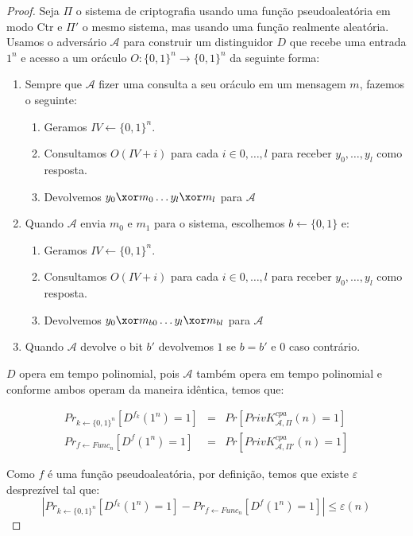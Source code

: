 \begin{proof}
  Seja $\Pi$ o sistema de criptografia usando uma função pseudoaleatória em modo Ctr e $\Pi'$ o mesmo sistema, mas usando uma função realmente aleatória.
Usamos o adversário $\mathcal{A}$ para construir um distinguidor $D$ que recebe uma entrada $1^n$ e acesso a um oráculo $O:\{0,1\}^n \to \{0,1\}^n$ da seguinte forma:
\begin{enumerate}
\item Sempre que $\mathcal{A}$ fizer uma consulta a seu oráculo em um mensagem $m$, fazemos o seguinte:
\begin{enumerate}
\item Geramos $IV \leftarrow \{0,1\}^n$.
\item Consultamos $O(IV + i)$ para cada $i \in 0, \dots, l$ para receber $y_0, \dots, y_l$ como resposta.
\item Devolvemos $y_0 \xor m_0 \dots y_l \xor m_l$ para $\mathcal{A}$
\end{enumerate}
\item Quando $\mathcal{A}$ envia $m_0$ e $m_1$ para o sistema, escolhemos $b \leftarrow \{0,1\}$ e:
\begin{enumerate}
\item Geramos $IV \leftarrow \{0,1\}^n$.
\item Consultamos $O(IV + i)$ para cada $i \in 0, \dots, l$ para receber $y_0, \dots, y_l$ como resposta.
\item Devolvemos $y_0 \xor m_{b0} \dots y_l \xor m_{bl}$ para $\mathcal{A}$
\end{enumerate}
\item Quando $\mathcal{A}$ devolve o bit $b'$ devolvemos $1$ se $b = b'$ e $0$ caso contrário.
\end{enumerate}

$D$ opera em tempo polinomial, pois $\mathcal{A}$ também opera em tempo polinomial e conforme ambos operam da maneira idêntica, temos que:

\begin{eqnarray*}
  Pr_{k \leftarrow \{0,1\}^n}[D^{f_k}(1^n) = 1] & = & Pr[PrivK^{cpa}_{\mathcal{A},\Pi}(n) = 1]\\
  Pr_{f \leftarrow Func_n}[D^{f}(1^n) = 1] & = & Pr[PrivK^{cpa}_{\mathcal{A},\Pi'}(n) = 1]
\end{eqnarray*}
 
Como $f$ é uma função pseudoaleatória, por definição, temos que existe $\varepsilon$ desprezível tal que:
\begin{displaymath}
  |Pr_{k \leftarrow \{0,1\}^n}[D^{f_k}(1^n) = 1] - Pr_{f \leftarrow Func_n}[D^{f}(1^n) = 1]| \leq \varepsilon(n)
\end{displaymath}


\end{proof}

